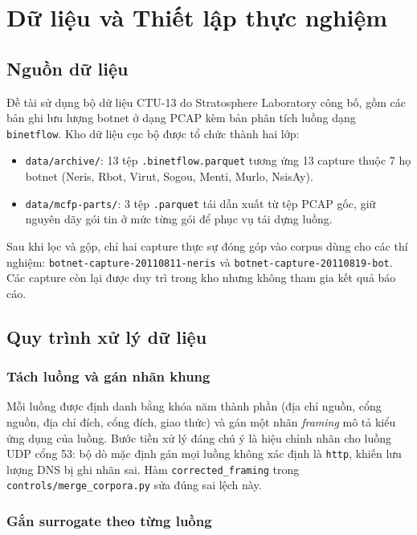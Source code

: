 \documentclass[12pt, a4paper, openany]{book}
\begin{document}
\chapter{Dữ liệu và Thiết lập thực nghiệm}
\label{ch:data}

\section{Nguồn dữ liệu}

Đề tài sử dụng bộ dữ liệu CTU-13 \cite{ctu13} do Stratosphere Laboratory công bố, gồm các bản ghi lưu lượng botnet ở dạng PCAP kèm bản phân tích luồng dạng \texttt{binetflow}. Kho dữ liệu cục bộ được tổ chức thành hai lớp:

\begin{itemize}
    \item \texttt{data/archive/}: 13 tệp \texttt{.binetflow.parquet} tương ứng 13 capture thuộc 7 họ botnet (Neris, Rbot, Virut, Sogou, Menti, Murlo, NsisAy).
    \item \texttt{data/mcfp-parts/}: 3 tệp \texttt{.parquet} tái dẫn xuất từ tệp PCAP gốc, giữ nguyên dãy gói tin ở mức từng gói để phục vụ tái dựng luồng.
\end{itemize}

Sau khi lọc và gộp, chỉ hai capture thực sự đóng góp vào corpus dùng cho các thí nghiệm: \texttt{botnet-capture-20110811-neris} và \texttt{botnet-capture-20110819-bot}. Các capture còn lại được duy trì trong kho nhưng không tham gia kết quả báo cáo.

\section{Quy trình xử lý dữ liệu}

\subsection{Tách luồng và gán nhãn khung}

Mỗi luồng được định danh bằng khóa năm thành phần (địa chỉ nguồn, cổng nguồn, địa chỉ đích, cổng đích, giao thức) và gán một nhãn \emph{framing} mô tả kiểu ứng dụng của luồng. Bước tiền xử lý đáng chú ý là hiệu chỉnh nhãn cho luồng UDP cổng 53: bộ dò mặc định gán mọi luồng không xác định là \texttt{http}, khiến lưu lượng DNS bị ghi nhãn sai. Hàm \texttt{corrected\_framing} trong \texttt{controls/merge\_corpora.py} sửa đúng sai lệch này.

\subsection{Gắn surrogate theo từng luồng}
\end{document}
